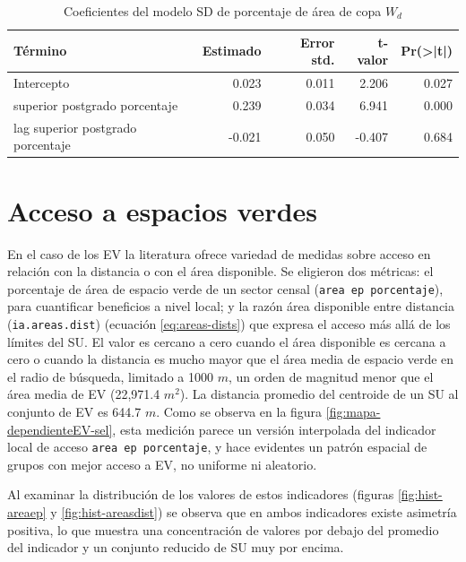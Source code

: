 \documentclass[12pt,a4paper,openany]{book}
\theoremstyle{definition}
\theoremstyle{definition}
\theoremstyle{definition}
\theoremstyle{remark}
\begin{document}
\begin{table}[t]

\caption{\label{tab:coef-sd-copaap}Coeficientes del modelo SD de porcentaje de área de copa $W_d$}
\centering
\begin{tabular}{lrrrr}
\toprule
Término & Estimado & Error std. & t-valor & Pr(>|t|)\\
\midrule
Intercepto & 0.023 & 0.011 & 2.206 & 0.027\\
superior postgrado porcentaje & 0.239 & 0.034 & 6.941 & 0.000\\
lag superior postgrado porcentaje & -0.021 & 0.050 & -0.407 & 0.684\\
\bottomrule
\end{tabular}
\end{table}

\section{Acceso a espacios verdes}\label{acceso-a-espacios-verdes-1}

En el caso de los EV la literatura ofrece variedad de medidas sobre
acceso en relación con la distancia o con el área disponible. Se
eligieron dos métricas: el porcentaje de área de espacio verde de un
sector censal (\texttt{area\ ep\ porcentaje}), para cuantificar
beneficios a nivel local; y la razón área disponible entre distancia
(\texttt{ia.areas.dist}) (ecuación \eqref{eq:areas-dists}) que expresa el
acceso más allá de los límites del SU. El valor es cercano a cero cuando
el área disponible es cercana a cero o cuando la distancia es mucho
mayor que el área media de espacio verde en el radio de búsqueda,
limitado a 1000 \(m\), un orden de magnitud menor que el área media de
EV (22,971.4 \(m^2\)). La distancia promedio del centroide de un SU al
conjunto de EV es 644.7 \(m\). Como se observa en la figura
\ref{fig:mapa-dependienteEV-sel}, esta medición parece un versión
interpolada del indicador local de acceso \texttt{area\ ep\ porcentaje},
y hace evidentes un patrón espacial de grupos con mejor acceso a EV, no
uniforme ni aleatorio.

Al examinar la distribución de los valores de estos indicadores (figuras
\ref{fig:hist-areaep} y \ref{fig:hist-areasdist}) se observa que en
ambos indicadores existe asimetría positiva, lo que muestra una
concentración de valores por debajo del promedio del indicador y un
conjunto reducido de SU muy por encima.
\end{document}
